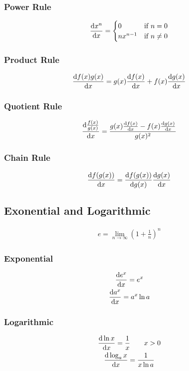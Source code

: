 \documentclass[12pt]{article}
\begin{document}
			\subsubsection{Power Rule}
				\begin{gather}
					\derivative{x^n} =
						\begin{cases}
							0 & \text{if } n = 0 \\
							nx^{n-1} & \text{if } n
							\neq 0
						\end{cases}
				\end{gather}
			\subsubsection{Product Rule}
				\begin{gather}
					\derivative{f(x)g(x)} = g(x)\derivative{f(x)} +
					f(x)\derivative{g(x)}
				\end{gather}
			\subsubsection{Quotient Rule}
				\begin{gather}
					\derivative{\frac{f(x)}{g(x)}} =
					\frac{g(x)\derivative{f(x)} -
					f(x)\derivative{g(x)}}{g(x)^2}
				\end{gather}
			\subsubsection{Chain Rule}
				\begin{gather}
					\derivative{f(g(x))} =
					\derivative[g(x)]{f(g(x))}\derivative{g(x)}
				\end{gather}
		\subsection{Exonential and Logarithmic}
			\begin{gather}
				e = \lim_{n \to \infty} \left(1 +
				\frac{1}{n}\right)^n
			\end{gather}
			\subsubsection{Exponential}
				\begin{gather}
					\derivative{e^x} = e^x \\
					\derivative{a^x} = a^x\ln a
				\end{gather}
			\subsubsection{Logarithmic}
				\begin{gather}
					\derivative{\ln x} = \frac{1}{x} \qquad x > 0 \\
					\derivative{\log_ax} = \frac{1}{x\ln a}
				\end{gather}
\end{document}
